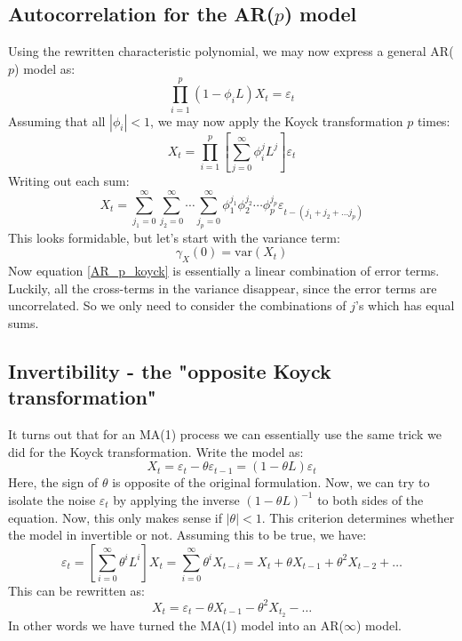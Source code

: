 \documentclass[12pt, a4paper]{article}
\numberwithin{equation}{section}
\begin{document}
\subsection{Autocorrelation for the AR($p$) model}
Using the rewritten characteristic polynomial, we may now express a general AR($p$) model as:
\begin{equation}
\prod_{i=1}^p(1-\phi_i L)X_t=\varepsilon_t
\end{equation}
Assuming that all $|\phi_i|<1$, we may now apply the Koyck transformation $p$ times:
\begin{equation}
X_t=\prod_{i=1}^p\left[\sum_{j=0}^\infty\phi_i^j L^j\right]\varepsilon_t
\end{equation}
Writing out each sum:
\begin{equation}
\label{AR_p_koyck}
X_t=\sum_{j_1=0}^\infty\sum_{j_2=0}^\infty\cdots\sum_{j_p=0}^\infty\phi_1^{j_1}\phi_2^{j_2}\cdots\phi_p^{j_p}\varepsilon_{t-(j_1+j_2+\ldots j_p)} 
\end{equation}
This looks formidable, but let's start with the variance term:
\begin{equation}
\gamma_X(0)=\textrm{var}(X_t)
\end{equation}
Now equation \ref{AR_p_koyck} is essentially a linear combination of error terms. Luckily, all the cross-terms in the variance disappear, since the error terms are uncorrelated. So we only need to consider the combinations of $j$'s which has equal sums.

\subsection{Invertibility - the "opposite Koyck transformation"}
It turns out that for an MA(1) process we can essentially use the same trick we did for the Koyck transformation. Write the model as:
\begin{equation}
X_t=\varepsilon_t-\theta\varepsilon_{t-1}=(1-\theta L)\varepsilon_t
\end{equation}
Here, the sign of $\theta$ is opposite of the original formulation. Now, we can try to isolate the noise $\varepsilon_t$ by applying the inverse $(1-\theta L)^{-1}$ to both sides of the equation. Now, this only makes sense if $|\theta|<1$. This criterion determines whether the model in invertible or not. Assuming this to be true, we have:
\begin{equation}
\varepsilon_t=\left[\sum_{i=0}^\infty\theta^i L^i\right]X_t=\sum_{i=0}^\infty \theta^i X_{t-i}=X_t+\theta X_{t-1}+\theta^2 X_{t-2}+\ldots
\end{equation}
This can be rewritten as:
\begin{equation}
X_t=\varepsilon_t-\theta X_{t-1}-\theta^2 X_{t_2}-\ldots
\end{equation}
In other words we have turned the MA(1) model into an AR($\infty$) model.
\end{document}
